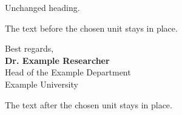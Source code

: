 \documentclass[11pt]{article}
\newcommand{\PersonName}{Dr. Example Researcher}
\begin{document}
Unchanged heading.

The text before the chosen unit stays in place.

\noindent\begin{minipage}{\linewidth}
Best regards,\\[10mm]
\textbf{\PersonName}\\[2pt]
Head of the Example Department\\[2pt]
Example University
\end{minipage}


\par\vspace{25mm}
The text after the chosen unit stays in place.
\end{document}
